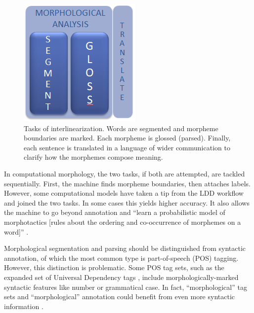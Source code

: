 \documentclass[12pt]{article}
\begin{document}
\begin{figure}[ht]
\begin{center}
\includegraphics[width=0.3\columnwidth]{IGT.PNG}
\caption{Tasks of interlinearization. Words are segmented and morpheme boundaries are marked. Each morpheme is glossed (parsed). Finally, each sentence is translated in a language of wider communication to clarify how the morphemes compose meaning.}
\label{fig:IGT}
\end{center}
\end{figure}
 
In computational morphology, the two tasks, if both are attempted, are tackled sequentially. First, the machine finds morpheme boundaries, then attaches labels. However, some computational models have taken a tip from the LDD workflow and joined the two tasks. In some cases this yields higher accuracy. It also allows the machine to go beyond annotation and ``learn a probabilistic model of morphotactics [rules about the ordering and co-occurrence of morphemes on a word]'' \cite[p. 165]{cotterell_labeled_2015}.

Morphological segmentation and parsing should be distinguished from syntactic annotation, of which the most common type is part-of-speech (POS) tagging. However, this distinction is problematic. Some POS tag sets, such as the expanded set of Universal Dependency tags \cite{de_marneffe_universal_2014}, include morphologically-marked syntactic features like number or grammatical case. In fact, ``morphological'' tag sets and ``morphological'' annotation could benefit from even more syntactic information \cite{cotterell_cross-lingual_2017}. 
\end{document}
